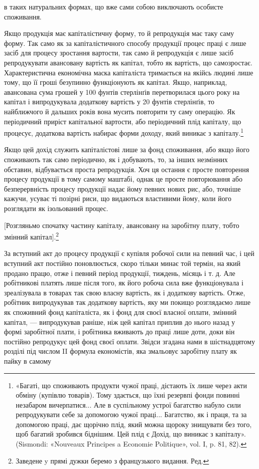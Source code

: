 в таких натуральних формах, що вже сами собою виключають
особисте споживання.

Якщо продукція має капіталістичну форму, то й репродукція
має таку саму форму. Так само як за капіталістичного способу
продукції процес праці є лише засіб для процесу зростання
вартости, так само й репродукція є лише засіб репродукувати
авансовану вартість як капітал, тобто як вартість, що самозростає.
Характеристична економічна маска капіталіста тримається
на якійсь людині лише тому, що її гроші безупинно функціонують
як капітал. Якщо, наприклад, авансована сума грошей
у 100 фунтів стерлінґів перетворилася цього року на капітал
і випродукувала додаткову вартість у 20 фунтів стерлінґів,
то найближчого й дальших років вона мусить повторити ту саму
операцію. Як періодичний приріст капітальної вартости, або
періодичний плід капіталу, що процесує, додаткова вартість набирає
форми доходу, який виникає з капіталу.\footnote{
«Багаті, що споживають продукти чужої праці, дістають їх лише
через акти обміну (купівлю товарів). Тому здається, що їхні резервпі
фонди повинні незабаром вичерпатися... Але в суспільному устрої багатство
набуло сили репродукувати себе за допомогою чужої праці... Багатство,
як і праця, та за допомогою праці, дає щорічно плід, який можна
щороку знищувати без того, щоб багатий зробився біднішим. Цей плід є
Дохід, що виникає з капіталу». (Sismondi: «Nouveaux Principes a Economie
Politique», vol. I, p. 81, 82).
}

Якщо цей дохід служить капіталістові лише за фонд споживання,
або якщо його споживають так само періодично, як і
добувають, то, за інших незмінних обставин, відбувається проста
репродукція. Хоч ця остання є просте повторення процесу продукції
в тому самому маштабі, однак це просте повторювання або
безперервність процесу продукції надає йому певних нових рис,
або, точніше кажучи, усуває ті позірні риси, що видаються властивими
йому, коли його розглядати як ізольований процес.

[Розгляньмо спочатку частину капіталу, авансовану на заробітну
плату, тобто змінний капітал].\footnote*{
Заведене y прямі дужки беремо з французького видання. Ред.
}

За вступний акт до процесу продукції є купівля робочої сили
на певний час, і цей вступний акт постійно поновлюється, скоро
тільки минає той термін, на який продано працю, отже і певний
період продукції, тиждень, місяць і т. д. Але робітникові платять
лише після того, як його робоча сила вже функціонувала і зреалізувала
в товарах так свою власну вартість, як і додаткову вартість.
Отже, робітник випродукував так додаткову вартість, яку
ми покищо розглядаємо лише як споживний фонд капіталіста,
як і фонд для своєї власної оплати, змінний капітал, — випродукував
раніше, ніж цей капітал приплив до нього назад у формі
заробітної плати, і робітника вживають до праці лише доти,
доки він постійно репродукує цей фонд своєї оплати. Звідси
згадана нами в шістнадцятому розділі під числом II формула
економістів, яка змальовує заробітну плату як пайку в самому